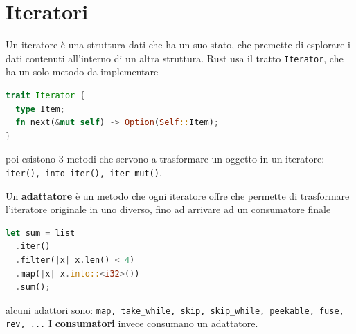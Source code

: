 \documentclass[12pt]{article}
\begin{document}
\section{Iteratori}
Un iteratore \`e una struttura dati che ha un suo stato, che premette di esplorare i dati contenuti all'interno di un altra struttura. Rust usa il tratto \texttt{Iterator}, che ha un solo metodo da implementare
\begin{lstlisting}[language=rust]
trait Iterator {
  type Item;
  fn next(&mut self) -> Option(Self::Item);
}
\end{lstlisting}
poi esistono 3 metodi che servono a trasformare un oggetto in un iteratore: \texttt{iter(), into_iter(), iter_mut()}.

Un \textbf{adattatore} \`e un metodo che ogni iteratore offre che permette di trasformare l'iteratore originale in uno diverso, fino ad arrivare ad un consumatore finale
\begin{lstlisting}[language=rust]
let sum = list
  .iter()
  .filter(|x| x.len() < 4)
  .map(|x| x.into::<i32>())
  .sum();
\end{lstlisting}
alcuni adattori sono: \texttt{map, take_while, skip, skip_while, peekable, fuse, rev, ...} I \textbf{consumatori} invece consumano un adattatore.
\end{document}
